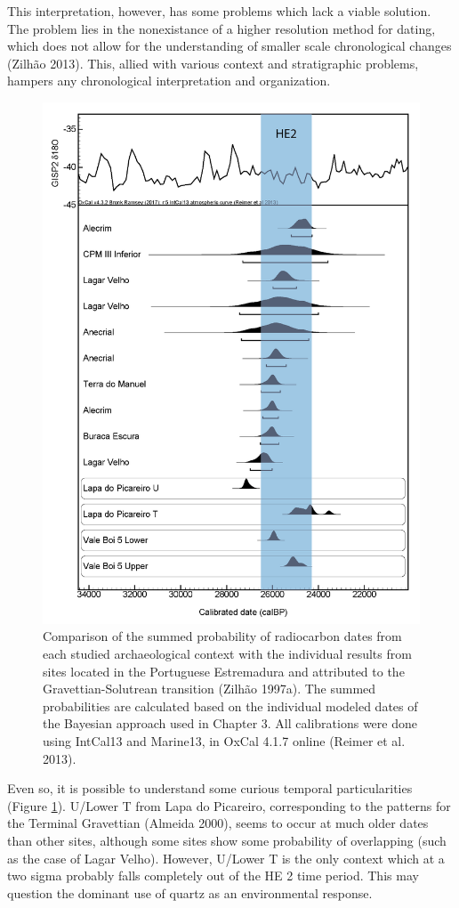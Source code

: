 \documentclass[12pt,twoside]{reedthesis}
\begin{document}
This interpretation, however, has some problems which lack a viable solution. The problem lies in the nonexistance of a higher resolution method for dating, which does not allow for the understanding of smaller scale chronological changes (Zilhão 2013). This, allied with various context and stratigraphic problems, hampers any chronological interpretation and organization.
\begin{figure}[H]

{\centering \includegraphics[width=0.7\linewidth]{figure/c14_all} 

}

\caption{Comparison of the summed probability of radiocarbon dates from each studied archaeological context with the individual results from sites located in the Portuguese Estremadura and attributed to the Gravettian-Solutrean transition (Zilhão 1997a). The summed probabilities are calculated based on the individual modeled dates of the Bayesian approach used in Chapter 3. All calibrations were done using IntCal13 and Marine13, in OxCal 4.1.7 online (Reimer et al. 2013).}\label{fig:datesall}
\end{figure}
Even so, it is possible to understand some curious temporal particularities (Figure \ref{fig:datesall}). U/Lower T from Lapa do Picareiro, corresponding to the patterns for the Terminal Gravettian (Almeida 2000), seems to occur at much older dates than other sites, although some sites show some probability of overlapping (such as the case of Lagar Velho). However, U/Lower T is the only context which at a two sigma probably falls completely out of the HE 2 time period. This may question the dominant use of quartz as an environmental response.
\end{document}
